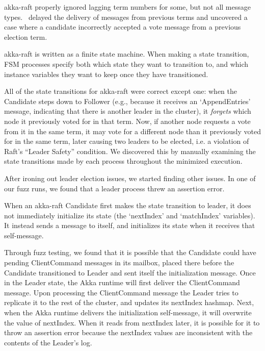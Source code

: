 akka-raft properly ignored lagging term numbers for some, but not all
 message types. \sys~delayed the delivery of messages from previous terms and
 uncovered a case where a candidate incorrectly accepted a vote message from a previous election term.

 akka-raft is written as a finite state machine.
When making a state transition, FSM processes specify both which state they want to transition to, and which instance variables they want to keep once they have transitioned.

All of the state transitions for akka-raft were correct except
one: when the Candidate
steps down to Follower (e.g., because it receives an `AppendEntries' message,
indicating that there is another leader in the cluster), it
{\em forgets} which node it previously voted for in that term. Now, if another
node requests a vote from it in the same term, it may vote for
a different node than it previously voted for in the same term, later causing
two leaders to be elected, i.e. a violation of Raft's ``Leader Safety''
condition. We discovered this by manually examining the state
transitions made by each process throughout the minimized execution.

 After ironing out leader election issues, we started finding other issues.
 In one of our fuzz runs, we found that a leader process threw an assertion error.

When an akka-raft Candidate first makes the state transition to leader, it does not immediately initialize its
 state (the `nextIndex' and `matchIndex' variables). It instead sends a message to itself, and initializes its state when it receives that self-message.

Through fuzz testing, we found that it is possible that the Candidate could have pending
 ClientCommand messages in its mailbox, placed there before the Candidate transitioned to Leader
 and sent itself the initialization message. Once in the Leader state, the Akka runtime will first deliver
 the ClientCommand message. Upon processing the ClientCommand message the Leader tries to replicate it to
 the rest of the cluster, and updates its nextIndex hashmap. Next, when the Akka runtime delivers the
 initialization self-message, it will overwrite the value of nextIndex. When it reads from nextIndex later,
 it is possible for it to throw an assertion error because the nextIndex values are inconsistent with
 the contents of the Leader's log.


